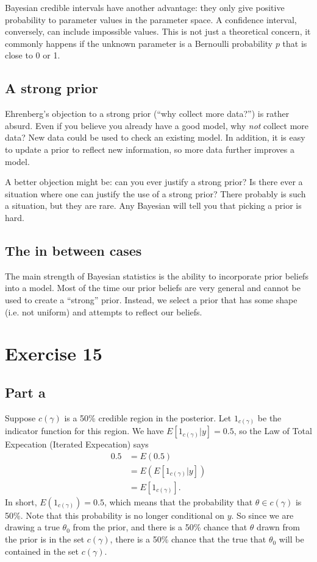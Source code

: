 \documentclass[a4paper,10pt]{article}
\begin{document}
Bayesian credible intervals have another advantage:  they only give positive probability to parameter values in the parameter space.  A confidence interval, conversely, can include impossible values.  This is not just a theoretical concern, it commonly happens if the unknown parameter is a Bernoulli probability $p$ that is close to 0 or 1.  

\subsection{A strong prior}
Ehrenberg's objection to a strong prior (``why collect more data?'') is rather absurd. Even if you believe you already have a good model, why \emph{not} collect more data?  New data could be used to check an existing model.  In addition, it is easy to update a prior to reflect new information, so more data further improves a model.

A better objection might be: can you ever justify a strong prior?  Is there ever a situation where one can justify the use of a strong prior?  There probably is such a situation, but they are rare.  Any Bayesian will tell you that picking a prior is hard.  

\subsection{The in between cases}
The main strength of Bayesian statistics is the ability to incorporate prior beliefs into a model.  Most of the time our prior beliefs are very general and cannot be used to create a ``strong'' prior.  Instead, we select a prior that has some shape (i.e. not uniform) and attempts to reflect our beliefs.  

\section{Exercise 15}
\subsection{Part a}
Suppose $c(\gamma)$ is a 50\% credible region in the posterior.  Let $1_{c(\gamma)}$ be the indicator function for this region.  We have $E[1_{c(\gamma)}|y]=0.5$, so the Law of Total Expecation (Iterated Expecation) says
\begin{align*}
0.5 &= E(0.5) \\
&= E\left(E[1_{c(\gamma)}|y]\right) \\
&= E[1_{c(\gamma)}].
\end{align*}
In short, $E(1_{c(\gamma)})=0.5$, which means that the probability that $\theta \in c(\gamma)$ is 50\%.  Note that this probability is no longer conditional on $y$.  So since we are drawing a true $\theta_{0}$ from the prior, and there is a 50\% chance that $\theta$ drawn from the prior is in the set $c(\gamma)$, there is a 50\% chance that the true that $\theta_{0}$ will be contained in the set $c(\gamma)$.  
\end{document}
